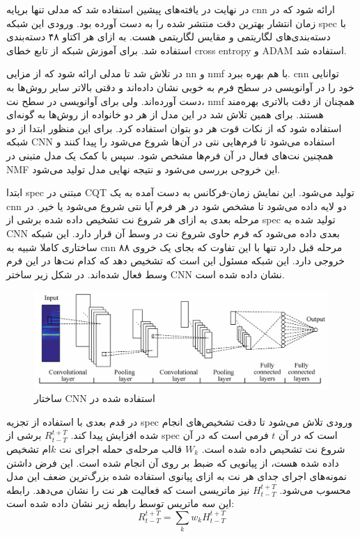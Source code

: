 در نهایت در یافته‌های پیشین استفاده شد که مدلی تنها برپایه \gls{cnn} ارائه شود
که در زمان انتشار بهترین دقت منتشر شده را به دست آورده بود. ورودی این شبکه
\gls{spec} با دسته‌بندی‌های لگاریتمی و مقایس لگاریتمی هست. به ازای هر اکتاو ۴۸
دسته‌بندی استفاده شد. برای آموزش شبکه از تابع خطای \gls{cross entropy} و ADAM
استفاده شد.

در \cite{wang2017two} تلاش شد تا مدلی ارائه شود که از مزایی \gls{nn} و \gls{nmf}
با هم بهره ببرد. \gls{cnn} توانایی خود را در آوانویسی در سطح فرم به خوبی نشان
داده‌اند و دقتی بالاتر سایر روش‌ها به دست آورده‌اند. ولی برای آوانویسی در سطح
نت، \gls{nmf} همچنان از دقت بالاتری بهره‌مند هستند. برای همین تلاش شد در این مدل
از هر دو خانواده از روش‌ها به گونه‌ای استفاده شود که از نکات قوت هر دو بتوان
استفاده کرد. برای این منظور ابتدا از دو شبکه \gls{CNN} استفاده می‌شود تا
فرم‌هایی نتی در آن‌ها شروع می‌شود را پیدا کنند و همچنین نت‌های فعال در آن فرم‌ها
مشخص شود. سپس با کمک یک مدل متبنی در \gls{NMF} این خروجی بررسی می‌شود و نتیجه
نهایی مدل تولید می‌شود.

ابتدا \gls{spec} مبتنی در \gls{CQT} تولید می‌شود. این نمایش زمان-فرکانس به دست
آمده به یک \gls{cnn} دو لایه داده می‌شود تا مشخص شود در هر فرم آیا نتی شروع
می‌شود یا خیر. در مرحله بعدی به ازای هر شروع نت تشخیص داده شده برشی از
\gls{spec} تولید شده به \gls{CNN} بعدی داده می‌شود که فرم حاوی شروع نت در وسط آن
قرار دارد. این شبکه ساختاری کاملا شبیه به \gls{cnn} مرحله قبل دارد تنها با این
تفاوت که بجای یک خروی ۸۸ خروجی دارد. این شبکه مسئول این است که تشخیص دهد که کدام
نت‌ها در این فرم وسط فعال شده‌اند. در شکل زیر ساختر \gls{CNN} نشان داده شده است.
\begin{figure}[ht]
    \centering
    \includegraphics[width=12cm]{./statics/wang2017two_cnn.png}
    \caption{ساختار \gls{CNN} استفاده شده در \cite{wang2017two}}
\end{figure}

در قدم بعدی با استفاده از تجزیه \gls{spec} ورودی تلاش می‌شود تا دقت تشخیص‌های
انجام شده افزایش پیدا کند. $R_{t - T}^{t + T}$ برشی از \gls{spec} است که در آن
$t$ فرمی است که در آن شروع نت تشحیص داده شده است. $W_k$ قالب مرحله‌ی حمله اجرای
نت $k$ام تشخیص داده شده هست، از پیانویی که ضبط بر روی آن انجام شده است. این فرض
داشتن نمونه‌های اجرای جدای هر نت به ازای پیانوی استفاده شده بزرگ‌ترین ضعف این
مدل محسوب می‌شود. $H_{t - T}^{t + T}$ نیز ماتریسی‌ است که فعالیت هر نت را نشان
می‌دهد. رابطه این سه ماتریس توسط رابطه زیر نشان داده شده است:
\begin{equation}
    R_{t - T}^{t + T} = \sum_{k} w_k H_{t - T}^{t + T}
\end{equation}

